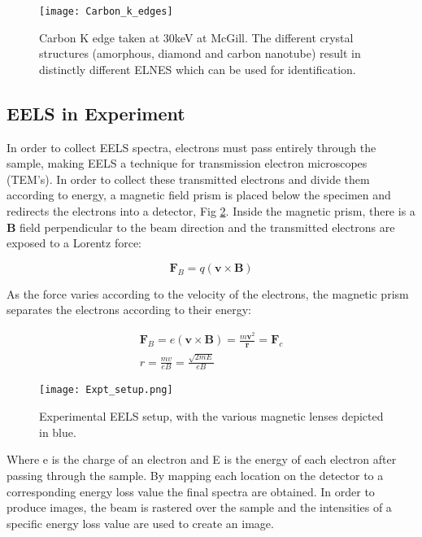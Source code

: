 \begin{figure}
	\centering
	\texttt{[image: Carbon\_k\_edges]}
	\caption{Carbon K edge taken at 30keV at McGill. The different crystal structures (amorphous, diamond and carbon nanotube) result in distinctly different ELNES which can be used for identification.   }
	\label{carbon-k-edge}
\end{figure}


\subsection{EELS in Experiment}

In order to collect EELS spectra, electrons must pass entirely through the sample, making EELS a technique for transmission electron microscopes (TEM's)\cite{Egerton}. In order to collect these transmitted electrons and divide them according to energy, a magnetic field prism is placed below the specimen and redirects the electrons into a detector, Fig \ref{prism}.  Inside the magnetic prism, there is a $\mathrm{\textbf{B}}$ field perpendicular to the beam direction and the transmitted electrons are exposed to a Lorentz force: 


\begin{equation}
	\textbf{F}_B = q (\textbf{v} \times \textbf{B})
\end{equation}

As the force varies according to the velocity of the electrons, the magnetic prism  separates the electrons according to their energy: 

\begin{gather}
\textbf{F}_B = e (\textbf{v} \times \textbf{B}) =  \frac{m \textbf{v}^2}{\textbf{r}} = \textbf{F}_c \\
 r =  \frac{mv}{eB} = \frac{\sqrt{2mE}}{eB}
\end{gather}

\begin{figure}
 \centering
 \texttt{[image: Expt\_setup.png]}
 \caption{Experimental EELS setup, with the various magnetic lenses depicted in blue.  }
 \label{prism}
 
\end{figure}

Where e is the charge of an electron and E is the energy of each electron after passing through the sample.  By mapping each location on the detector to a corresponding energy loss value the final spectra are obtained. In order to produce images, the beam is rastered over the sample and the intensities of a specific energy loss value are used to create an image. 

